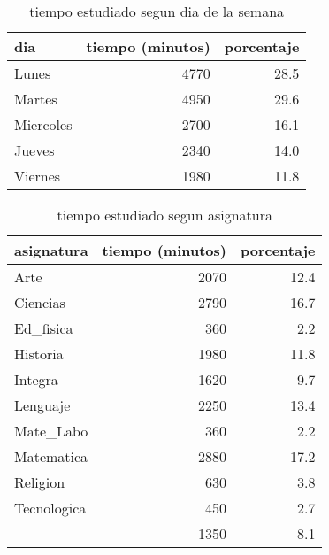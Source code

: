 \documentclass[spanish]{article}
\begin{document}
\begin{table}[h!]
\begin{center}
\begin{tabular}{|l|r|r|}
\hline
dia       & tiempo (minutos) & porcentaje   \\ \hline
Lunes     &             4770 &          28.5\\ \hline
Martes    &             4950 &          29.6\\ \hline
Miercoles &             2700 &          16.1\\ \hline
Jueves    &             2340 &          14.0\\ \hline
Viernes   &             1980 &          11.8\\ \hline
\end{tabular}
\caption{tiempo estudiado segun dia de la semana}
\end{center}
\end{table}

\begin{table}[h!]
\begin{center}
\begin{tabular}{|l|r|r|}
\hline
asignatura  & tiempo (minutos) & porcentaje   \\ \hline
Arte        &             2070 &          12.4\\ \hline
Ciencias    &             2790 &          16.7\\ \hline
Ed\_fisica   &              360 &           2.2\\ \hline
Historia    &             1980 &          11.8\\ \hline
Integra     &             1620 &           9.7\\ \hline
Lenguaje    &             2250 &          13.4\\ \hline
Mate\_Labo   &              360 &           2.2\\ \hline
Matematica  &             2880 &          17.2\\ \hline
Religion    &              630 &           3.8\\ \hline
Tecnologica &              450 &           2.7\\ \hline
            &             1350 &           8.1\\ \hline
\end{tabular}
\caption{tiempo estudiado segun asignatura}
\end{center}
\end{table}
\end{document}
